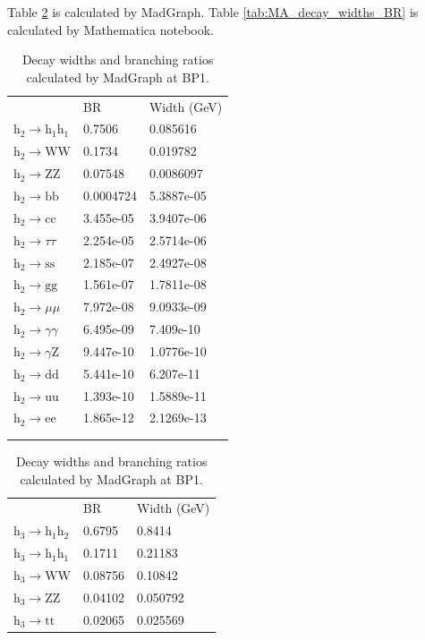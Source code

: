 \documentclass[12pt]{article}
\begin{document}
	Table \ref{tab:MG_decay_widths_BR} is calculated by MadGraph. Table \ref{tab:MA_decay_widths_BR} is calculated by Mathematica notebook.
	\begin{table}[htpb]
		\centering
		\caption{Decay widths and branching ratios calculated by MadGraph at BP1.}
		\label{tab:MG_decay_widths_BR}
		\begin{tabular}{lll}
								  & BR        & Width (GeV) \\
			$\text{h}_2\to\text{h}_1\text{h}_1$ & 0.7506    & 0.085616    \\
			$\text{h}_2\to\text{WW}$   & 0.1734    & 0.019782    \\
			$\text{h}_2\to\text{ZZ}$   & 0.07548   & 0.0086097   \\
			$\text{h}_2\to\text{bb}$   & 0.0004724 & 5.3887e-05  \\
			$\text{h}_2\to\text{cc}$   & 3.455e-05 & 3.9407e-06  \\
			$\text{h}_2\to\tau\tau$   & 2.254e-05 & 2.5714e-06  \\
			$\text{h}_2\to\text{ss}$   & 2.185e-07 & 2.4927e-08  \\
			$\text{h}_2\to\text{gg}$   & 1.561e-07 & 1.7811e-08  \\
			$\text{h}_2\to\mu\mu$   & 7.972e-08 & 9.0933e-09  \\
			$\text{h}_2\to\gamma\gamma$   & 6.495e-09 & 7.409e-10   \\
			$\text{h}_2\to\gamma\text{Z}$   & 9.447e-10 & 1.0776e-10  \\
			$\text{h}_2\to\text{dd}$   & 5.441e-10 & 6.207e-11   \\
			$\text{h}_2\to\text{uu}$   & 1.393e-10 & 1.5889e-11  \\
			$\text{h}_2\to\text{ee}$   & 1.865e-12 & 2.1269e-13  \\
			\\
			\\
		\end{tabular}	
		\begin{tabular}{lll}
								  & BR        & Width (GeV) \\
			$\text{h}_3\to\text{h}_1\text{h}_2$ & 0.6795    & 0.8414      \\
			$\text{h}_3\to\text{h}_1\text{h}_1$ & 0.1711    & 0.21183     \\
			$\text{h}_3\to\text{WW}$   & 0.08756   & 0.10842     \\
			$\text{h}_3\to\text{ZZ}$   & 0.04102   & 0.050792    \\
			$\text{h}_3\to\text{tt}$   & 0.02065   & 0.025569    \\

\end{tabular}
\end{table}
\end{document}
